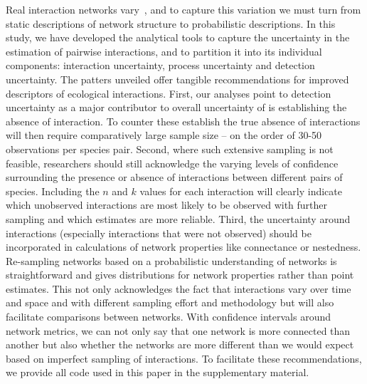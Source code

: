 \documentclass[12pt]{article}
\begin{document}
  Real interaction networks vary~\citep{}, and to capture this variation we must turn from static descriptions of network structure to probabilistic descriptions. In this study, we have developed the analytical tools to capture the uncertainty in the estimation of pairwise interactions, and to partition it into its individual components: interaction uncertainty, process uncertainty and detection uncertainty. The patters unveiled offer tangible recommendations for improved descriptors of ecological interactions. First, our analyses point to detection uncertainty as a major contributor to overall uncertainty of is establishing the absence of interaction. To counter these establish the true absence of interactions will then require comparatively large sample size – on the order of 30-50 observations per species pair. Second, where such extensive sampling is not feasible, researchers should still acknowledge the varying levels of confidence surrounding the presence or absence of interactions between different pairs of species. Including the $n$ and $k$ values for each interaction will clearly indicate which unobserved interactions are most likely to be observed with further sampling and which estimates are more reliable. Third, the uncertainty around interactions (especially interactions that were not observed) should be incorporated in calculations of network properties like connectance or nestedness. Re-sampling networks based on a probabilistic understanding of networks is straightforward and gives distributions for network properties rather than point estimates. This not only acknowledges the fact that interactions vary over time and space and with different sampling effort and methodology but will also facilitate comparisons between networks. With confidence intervals around network metrics, we can not only say that one network is more connected than another but also whether the networks are more different than we would expect based on imperfect sampling of interactions. To facilitate these recommendations, we provide all code used in this paper in the supplementary material. 



\end{document}

